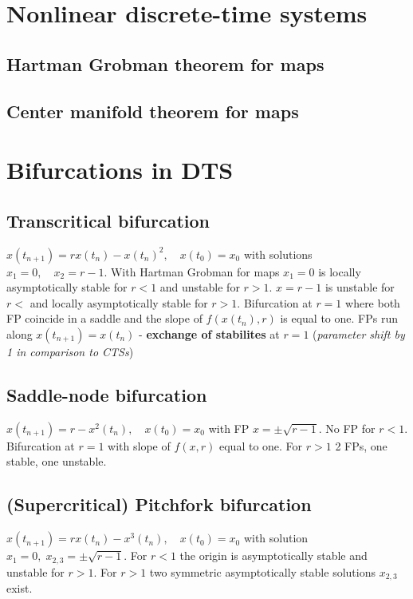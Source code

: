 \section{Nonlinear discrete-time systems}
\subsection{Hartman Grobman theorem for maps}
\subsection{Center manifold theorem for maps}

\section{Bifurcations in DTS}
\subsection{Transcritical bifurcation}
$x(t_{n+1})= rx(t_n)-x(t_n)^2, \quad x(t_0)=x_0$ with solutions $x_1=0, \quad x_2=r-1$. With Hartman Grobman for maps $x_1=0$ is locally asymptotically stable for $r<1$ and unstable for $r>1$. $x=r-1$ is unstable for $r<$ and locally asymptotically stable for $r>1$. Bifurcation at $r=1$ where both FP coincide in a saddle and the slope of $f(x(t_n),r)$ is equal to one. FPs run along $x(t_{n+1})=x(t_n)$ - \textbf{exchange of stabilites} at $r=1$ (\emph{parameter shift by 1 in comparison to CTSs})
\subsection{Saddle-node bifurcation}
$x(t_{n+1})=r-x^2(t_n), \quad x(t_0)=x_0$ with FP $x=\pm \sqrt{r-1}$. No FP for $r<1$. Bifurcation at $r=1$ with slope of $f(x,r)$ equal to one. For $r>1$ 2 FPs, one stable, one unstable.
\subsection{(Supercritical) Pitchfork bifurcation}
$x(t_{n+1})=rx(t_n)-x^3(t_n), \quad x(t_0)=x_0$ with solution $x_1=0,\; x_{2,3}=\pm \sqrt{r-1}$. For $r<1$ the origin is asymptotically stable and unstable for $r>1$. For $r>1$ two symmetric asymptotically stable solutions $x_{2,3}$ exist.
